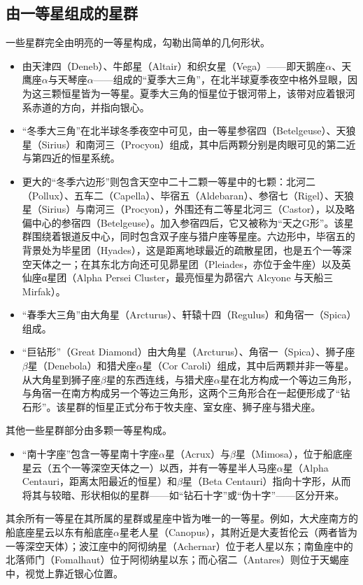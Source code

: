 \subsection{由一等星组成的星群}
一些星群完全由明亮的一等星构成，勾勒出简单的几何形状。
\begin{itemize}
\item 由天津四（Deneb）、牛郎星（Altair）和织女星（Vega）——即天鹅座$\alpha$、天鹰座$\alpha$与天琴座$\alpha$——组成的“夏季大三角”，在北半球夏季夜空中格外显眼，因为这三颗恒星皆为一等星。夏季大三角的恒星位于银河带上，该带对应着银河系赤道的方向，并指向银心。
\item “冬季大三角”在北半球冬季夜空中可见，由一等星参宿四（Betelgeuse）、天狼星（Sirius）和南河三（Procyon）组成，其中后两颗分别是肉眼可见的第二近与第四近的恒星系统。
\item 更大的“冬季六边形”则包含天空中二十二颗一等星中的七颗：北河二（Pollux）、五车二（Capella）、毕宿五（Aldebaran）、参宿七（Rigel）、天狼星（Sirius）与南河三（Procyon），外围还有二等星北河三（Castor），以及略偏中心的参宿四（Betelgeuse）。加入参宿四后，它又被称为“天之G形”。该星群围绕着银道反中心，同时包含双子座与猎户座等星座。六边形中，毕宿五的背景处为毕星团（Hyades），这是距离地球最近的疏散星团，也是五个一等深空天体之一；在其东北方向还可见昴星团（Pleiades，亦位于金牛座）以及英仙座α星团（Alpha Persei Cluster，最亮恒星为昴宿六 Alcyone 与天船三 Mirfak）。
\item “春季大三角”由大角星（Arcturus）、轩辕十四（Regulus）和角宿一（Spica）组成。
\item “巨钻形”（Great Diamond）由大角星（Arcturus）、角宿一（Spica）、狮子座$\beta$星（Denebola）和猎犬座$\alpha$星（Cor Caroli）组成，其中后两颗并非一等星。从大角星到狮子座$\beta$星的东西连线，与猎犬座$\alpha$星在北方构成一个等边三角形，与角宿一在南方构成另一个等边三角形，这两个三角形合在一起便形成了“钻石形”。该星群的恒星正式分布于牧夫座、室女座、狮子座与猎犬座。
\end{itemize}
其他一些星群部分由多颗一等星构成。
\begin{itemize}
\item “南十字座”包含一等星南十字座$\alpha$星（Acrux）与$\beta$星（Mimosa），位于船底座星云（五个一等深空天体之一）以西，并有一等星半人马座$\alpha$星（Alpha Centauri，距离太阳最近的恒星）和$\beta$星（Beta Centauri）指向十字形，从而将其与较暗、形状相似的星群——如“钻石十字”或“伪十字”——区分开来。
\end{itemize}
其余所有一等星在其所属的星群或星座中皆为唯一的一等星。例如，大犬座南方的船底座星云以东有船底座$\alpha$星老人星（Canopus），其附近是大麦哲伦云（两者皆为一等深空天体）；波江座中的阿彻纳星（Achernar）位于老人星以东；南鱼座中的北落师门（Fomalhaut）位于阿彻纳星以东；而心宿二（Antares）则位于天蝎座中，视觉上靠近银心位置。
